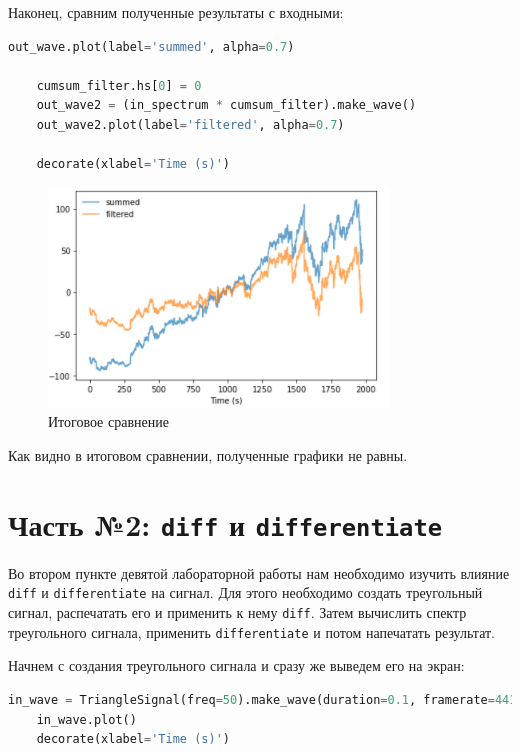 \documentclass[a4paper]{article}
\begin{document}
            Наконец, сравним полученные результаты с входными:
            
\begin{lstlisting}[language=Python, caption= Сравнение вычисленного фотношения с фильтром]
    out_wave.plot(label='summed', alpha=0.7)

    cumsum_filter.hs[0] = 0
    out_wave2 = (in_spectrum * cumsum_filter).make_wave()
    out_wave2.plot(label='filtered', alpha=0.7)
    
    decorate(xlabel='Time (s)')
\end{lstlisting}
            
            \begin{figure}[H]
                \centering
                \includegraphics{ex_1_new_result.png}
                \caption{Итоговое сравнение}
                \label{fig:ex_1_new_result}
            \end{figure}
            
            Как видно в итоговом сравнении, полученные графики не равны.
            
    \newpage
        \section{Часть №2: \texttt{diff} и \texttt{differentiate}}
            Во втором пункте девятой лабораторной работы нам необходимо изучить влияние \texttt{diff} и \texttt{differentiate} на сигнал. Для этого необходимо создать треугольный сигнал, распечатать его и применить к нему \texttt{diff}. Затем вычислить спектр треугольного сигнала, применить \texttt{differentiate} и потом напечатать результат. 
            
            Начнем с создания треугольного сигнала и сразу же выведем его на экран:
            
\begin{lstlisting}[language=Python, caption= Создание и вывод треугольного сигнала]
    in_wave = TriangleSignal(freq=50).make_wave(duration=0.1, framerate=44100)
    in_wave.plot()
    decorate(xlabel='Time (s)')
\end{lstlisting}
            
\end{document}
